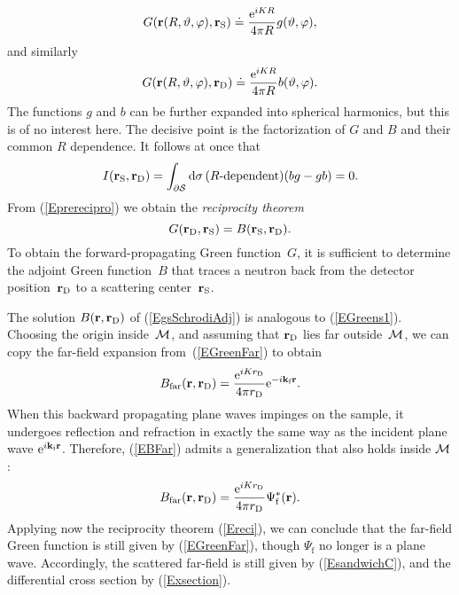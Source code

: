 \begin{equation}
   G(\mathbf{r}(R,\vartheta,\varphi),\mathbf{r}_\text{S})
   \doteq \frac{{\rm e}^{iKR}}{4\pi R} g(\vartheta,\varphi),
\end{equation}
and similarly 
\begin{equation}
   G(\mathbf{r}(R,\vartheta,\varphi),\mathbf{r}_\text{D})
   \doteq \frac{{\rm e}^{iKR}}{4\pi R} b(\vartheta,\varphi).
\end{equation}
The functions $g$ and $b$ can be further expanded into spherical harmonics,
but this is of no interest here.
The decisive point is the factorization of $G$ and $B$
and their common $R$ dependence.
It follows at once that
\begin{equation}
  I(\mathbf{r}_\text{S},\mathbf{r}_\text{D})
  =\displaystyle\int_{\partial\mathcal{S}}{\rm d}\sigma\,
       (\text{$R$-dependent})(bg-gb)
  = 0.
\end{equation}
From (\ref{Eprerecipro}) we obtain the \textit{reciprocity theorem}
\begin{equation}\label{Ereci}
  G(\mathbf{r}_\text{D},\mathbf{r}_\text{S}) = B(\mathbf{r}_\text{S},\mathbf{r}_\text{D}).
\end{equation}
To obtain the forward-propagating Green function~$G$,
it is sufficient to determine the adjoint Green function~$B$
that traces a neutron back from the detector position~$\mathbf{r}_\text{D}$
to a scattering center~$\mathbf{r}_\text{S}$.

The solution $B(\mathbf{r},\mathbf{r}_\text{D})$ of (\ref{EgsSchrodiAdj})
is analogous to (\ref{EGreens1}).
Choosing the origin inside~$\mathcal{M}$, 
and assuming that $\mathbf{r}_\text{D}$ lies far outside~$\mathcal{M}$,
we can copy the far-field expansion from~(\ref{EGreenFar})
to obtain
\begin{equation}\label{EBFar}
  B_\text{far}(\mathbf{r},\mathbf{r}_\text{D})
  =\frac{{\rm e}^{iKr_\text{D}}}{4\pi r_\text{D}}{\rm e}^{-i\mathbf{k}_\text{f} \mathbf{r}}.
\end{equation}
When this backward propagating plane waves impinges on the sample,
it undergoes reflection and refraction in exactly the same way as
the incident plane wave ${\rm e}^{i\mathbf{k}_\text{i}\mathbf{r}}$.
Therefore,
 (\ref{EBFar}) admits a generalization that also holds inside $\mathcal{M}$:
\begin{equation}\label{EBFull}
  B_\text{far}(\mathbf{r},\mathbf{r}_\text{D})
  = \frac{{\rm e}^{iKr_\text{D}}}{4\pi r_\text{D}}\Psi^*_\text{f}(\mathbf{r}).
\end{equation}
Applying now the reciprocity theorem (\ref{Ereci}),
we can conclude that the far-field Green function
is still given by (\ref{EGreenFar}),
though $\Psi_\text{f}$ no longer is a plane wave.
Accordingly,
the scattered far-field is still given by (\ref{EsandwichC}),
and the differential cross section by (\ref{Exsection}).

